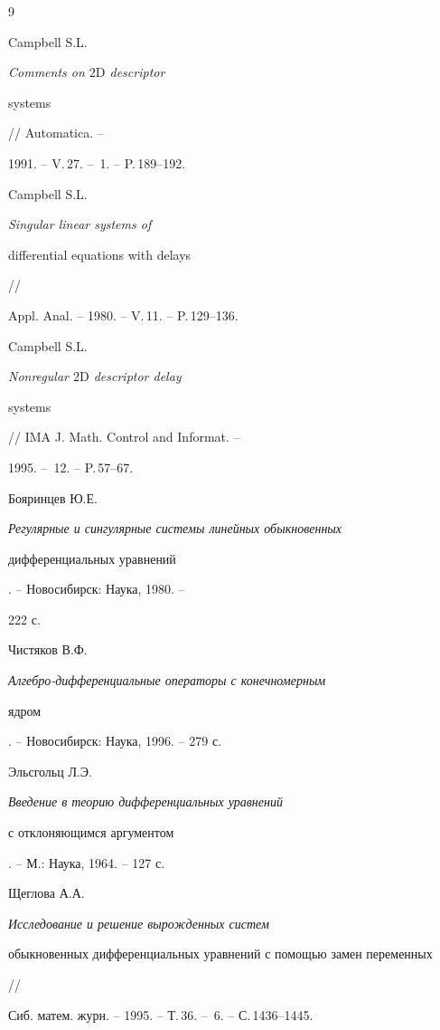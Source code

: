 \begin{thebibliography}{9}







Campbell S.L. {\it Comments on $2\mathrm D$ descriptor


systems} // Automatica. -- 


1991. -- V.\,27. -- \No\,1. -- P.\,189--192.




Campbell S.L. {\it Singular linear systems of 


differential equations with delays} // 


Appl. Anal. -- 1980. -- V.\,11. -- P.\,129--136.




Campbell S.L. {\it Nonregular $2\mathrm D$ descriptor delay


systems} // IMA J. Math. Control and Informat. --


1995. -- \No\,12. -- P.\,57--67.




Бояринцев Ю.Е. {\it Регулярные и сингулярные системы линейных обыкновенных


дифференциальных уравнений}. -- Новосибирск: Наука, 1980. --


222 с.




Чистяков В.Ф. {\it Алгебро-дифференциальные операторы с конечномерным


ядром}. -- Новосибирск: Наука, 1996. -- 279 с.




Эльсгольц Л.Э. {\it Введение в теорию дифференциальных уравнений


с отклоняющимся аргументом}. -- М.: Наука, 1964. -- 127 с.




Щеглова А.А. {\it Исследование и решение вырожденных систем 


обыкновенных дифференциальных уравнений с помощью замен переменных} //


Сиб. матем. журн. -- 1995. -- Т.\,36. -- \No\,6. -- С.\,1436--1445.





\end{thebibliography}





\vskip 2cm
















\label{end}






